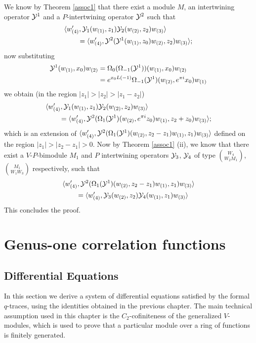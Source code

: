 \documentclass[12pt]{article}
\begin{document}
  We know by Theorem \ref{assoc1} that there exist a module $M$,
  an intertwining operator $\mathcal{Y}^1$ and a $P$-intertwining operator $\mathcal{Y}^2$ such that
  \begin{align*}
    &\langle w_{(4)}^\prime, \mathcal{Y}_1(w_{(1)}, z_1)
      \mathcal{Y}_2(w_{(2)}, z_2) w_{(3)}\rangle\\
    &\qquad = \langle w_{(4)}^\prime, \mathcal{Y}^2(\mathcal{Y}^1(w_{(1)}, z_0)
      w_{(2)}, z_2) w_{(3)}\rangle;
  \end{align*}
  now substituting
  \begin{align*}
    \mathcal{Y}^1(w_{(1)}, x_0)w_{(2)}
      &= \Omega_0(\Omega_{-1}(\mathcal{Y}^1))(w_{(1)}, x_0)w_{(2)}\\
      &= e^{x_0L(-1)}\Omega_{-1}(\mathcal{Y}^1)(w_{(2)}, e^{\pi i}x_0)w_{(1)}
  \end{align*}
  we obtain (in the region $|z_1| > |z_2| > |z_1 - z_2|$)
  \begin{align*}
    &\langle w_{(4)}^\prime, \mathcal{Y}_1(w_{(1)}, z_1)
      \mathcal{Y}_2(w_{(2)}, z_2) w_{(3)}\rangle\\
    &\qquad = \langle w_{(4)}^\prime, 
      \mathcal{Y}^2(\Omega_1(\mathcal{Y}^1)(w_{(2)},
      e^{\pi i}z_0) w_{(1)}, z_2 + z_0) w_{(3)}\rangle;
  \end{align*}
  which is an extension of $\langle w_{(4)}^\prime, 
      \mathcal{Y}^2(\Omega_1(\mathcal{Y}^1)(w_{(2)},
      z_2 - z_1) w_{(1)}, z_1) w_{(3)}\rangle$
  defined on the region $|z_1| > |z_2 - z_1| > 0$. Now by Theorem \ref{assoc1} (ii),
  we know that there exist a $V$-$P$-bimodule $M_1$ and $P$ intertwining operators
  $\mathcal{Y}_3$, $\mathcal{Y}_4$ of type $\binom{W_4}{W_2 M_1}$, $\binom{M_1}{W_1 W_3}$
  respectively, such that
  \begin{align*}
    &\langle w_{(4)}^\prime, 
      \mathcal{Y}^2(\Omega_1(\mathcal{Y}^1)(w_{(2)},
      z_2 - z_1) w_{(1)}, z_1) w_{(3)}\rangle\\
    &\qquad = \langle w_{(4)}^\prime, \mathcal{Y}_3(w_{(2)}, z_2)\mathcal{Y}_4(w_{(1)}, z_1) w_{(3)}\rangle
  \end{align*}
  This concludes the proof.
\epfv

\section{Genus-one correlation functions} \label{sec:2}

\subsection{Differential Equations}
\label{s-diffeq}

In this section we derive a system of differential equations satisfied by
the formal $q$-traces, using the identities obtained in the previous
chapter. The main technical assumption used in this chapter is
the $C_2$-cofiniteness of the generalized $V$-modules, which is used
to prove that a particular module over a ring of functions is finitely
generated.
\end{document}
